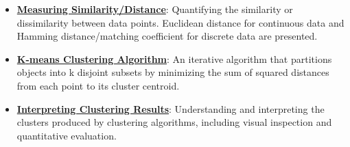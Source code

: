 \documentclass{article}%
\begin{document}
\begin{itemize}[leftmargin=*]
\item \href{https://purdue.brightspace.com/d2l/common/assets/pdfjs-d2l-dist/1.0.14-legacy/web/viewer.html?file=\%2Fcontent\%2Fenforced\%2F1095467-wl.202510.CS.24300.001\%2F12L2-distance-clusters.pdf\%3Fou\%3D1095467\&lang=en-us\&container=d2l-fileviewer-rendered-pdf\&fullscreen=d2l-fileviewer-rendered-pdf-dialog\&height=667#page=17}{\textbf{Measuring Similarity/Distance}}: Quantifying the similarity or dissimilarity between data points. Euclidean distance for continuous data and Hamming distance/matching coefficient for discrete data are presented.%
\item \href{https://purdue.brightspace.com/d2l/common/assets/pdfjs-d2l-dist/1.0.14-legacy/web/viewer.html?file=\%2Fcontent\%2Fenforced\%2F1095467-wl.202510.CS.24300.001\%2F12L2-distance-clusters.pdf\%3Fou\%3D1095467\&lang=en-us\&container=d2l-fileviewer-rendered-pdf\&fullscreen=d2l-fileviewer-rendered-pdf-dialog\&height=667#page=21}{\textbf{K{-}means Clustering Algorithm}}: An iterative algorithm that partitions objects into k disjoint subsets by minimizing the sum of squared distances from each point to its cluster centroid.%
\item \href{https://purdue.brightspace.com/d2l/common/assets/pdfjs-d2l-dist/1.0.14-legacy/web/viewer.html?file=\%2Fcontent\%2Fenforced\%2F1095467-wl.202510.CS.24300.001\%2F12L2-distance-clusters.pdf\%3Fou\%3D1095467\&lang=en-us\&container=d2l-fileviewer-rendered-pdf\&fullscreen=d2l-fileviewer-rendered-pdf-dialog\&height=667#page=36}{\textbf{Interpreting Clustering Results}}: Understanding and interpreting the clusters produced by clustering algorithms, including visual inspection and quantitative evaluation.%
\end{itemize}%
\end{document}
